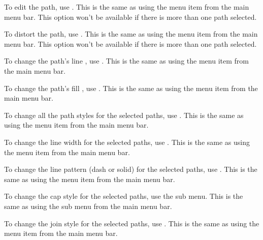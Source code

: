 
To edit the path, use . This is the same as using
the  menu item from the main menu bar.
This option won't be available if there is more than one
path selected.


To distort the path, use . This is the same as using
the  menu item from the main menu bar.
This option won't be available if there is more than one
path selected.


To change the path's line , use
. This is the same as using the
 menu item from the main menu bar.


To change the path's fill , use
. This is the same as using the
 menu item from the main menu bar.


To change all the path styles for the selected paths,
use . This is the same as using the
 menu item from the main menu bar.


To change the line width for the selected paths,
use . This is the same as using the
 menu item from the main menu bar.


To change the line pattern (dash or solid) for the selected paths,
use . This is the same as using the
 menu item from the main menu bar.


To change the cap style for the selected paths,
use the  sub menu. This is the same as using the
 sub menu from the main menu bar.


To change the join style for the selected paths,
use . This is the same as using the
 menu item from the main menu bar.

